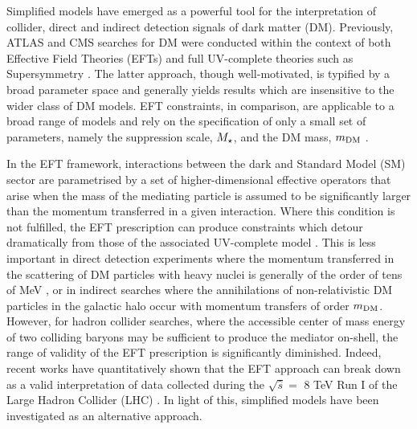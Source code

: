 Simplified models have emerged as a powerful tool for the interpretation of collider, direct and indirect detection signals of dark matter (DM). Previously, ATLAS and CMS searches for DM were conducted within the context of both Effective Field Theories (EFTs) \cite{Aad:1363019, ATLAS-CONF-2012-147, CMS-PAS-EXO-12-048, Abdallah:1472683} and full UV-complete theories such as Supersymmetry \cite{Aad:2012ms, Aad:2012fqa, Aad:2014wea, SUSY_official_paper}. The latter approach, though well-motivated, is typified by a broad parameter space and generally yields results which are insensitive to the wider class of DM models. EFT constraints, in comparison, are applicable to a broad range of models and rely on the specification of only a small set of parameters, namely the suppression scale, $M_{\star}$, and the DM mass, $m_{\mathrm{DM}}$ \cite{DMCons2}.

In the EFT framework, interactions between the dark and Standard Model (SM) sector are parametrised by a set of higher-dimensional effective operators that arise when the mass of the mediating particle is assumed to be significantly larger than the momentum transferred in a given interaction. Where this condition is not fulfilled, the EFT prescription can produce constraints which detour dramatically from those of the associated UV-complete model \cite{Bai:2010hh, DMCons2, Fox:2011fx, Graesser:2011vj, An:2011ck}. This is less important in direct detection experiments where the momentum transferred in the scattering of DM particles with heavy nuclei is generally of the order of tens of MeV \cite{EFTDM, DMCons3}, or in indirect searches where the annihilations of non-relativistic DM particles in the galactic halo occur with momentum transfers of order $m_{\mathrm{DM}}$. However, for hadron collider searches, where the accessible center of mass energy of two colliding baryons may be sufficient to produce the mediator on-shell, the range of validity of the EFT prescription is significantly diminished. Indeed, recent works have quantitatively shown that the EFT approach can break down as a valid interpretation of data collected during the $\sqrt{\hat{s}} =$ 8 TeV Run I of the Large Hadron Collider (LHC) \cite{Buchmueller:2013dya,ValidEFT, ValidEFT_part2, ValidEFT_part3}. In light of this, simplified models have been investigated as an alternative approach.

